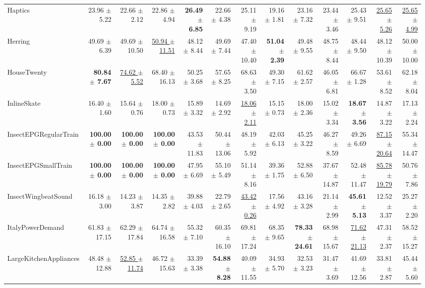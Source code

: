 \begin{landscape}
\begin{longtable}{lrrrrrrrrrrrr}
Haptics & 23.96 $\pm$ 5.22 & 22.66 $\pm$ 2.12 & 22.86 $\pm$ 4.94 & \textbf{26.49 $\pm$ 6.85} & 22.66 $\pm$ 4.38 & 25.11 $\pm$ 9.19 & 19.16 $\pm$ 1.81 & 23.16 $\pm$ 7.32 & 23.44 $\pm$ 3.46 & 25.43 $\pm$ 9.51 & \underline{25.65 $\pm$ 5.26} & \underline{25.65 $\pm$ 4.99} \\
Herring & 49.69 $\pm$ 6.39 & 49.69 $\pm$ 10.50 & \underline{50.94 $\pm$ 11.51} & 48.12 $\pm$ 8.44 & 49.69 $\pm$ 7.44 & 47.40 $\pm$ 10.40 & \textbf{51.04 $\pm$ 2.39} & 49.48 $\pm$ 9.55 & 48.75 $\pm$ 8.44 & 48.44 $\pm$ 9.50 & 48.12 $\pm$ 10.39 & 50.00 $\pm$ 10.00 \\
HouseTwenty & \textbf{80.84 $\pm$ 7.67} & \underline{74.62 $\pm$ 5.52} & 68.40 $\pm$ 16.13 & 50.25 $\pm$ 3.68 & 57.65 $\pm$ 8.25 & 68.63 $\pm$ 3.50 & 49.30 $\pm$ 7.15 & 61.62 $\pm$ 2.57 & 46.05 $\pm$ 6.81 & 66.67 $\pm$ 1.28 & 53.61 $\pm$ 8.52 & 62.18 $\pm$ 8.04 \\
InlineSkate & 16.40 $\pm$ 1.60 & 15.64 $\pm$ 0.76 & 18.00 $\pm$ 0.73 & 15.89 $\pm$ 3.32 & 14.69 $\pm$ 2.92 & \underline{18.06 $\pm$ 2.11} & 15.15 $\pm$ 0.73 & 18.00 $\pm$ 2.36 & 15.02 $\pm$ 3.34 & \textbf{18.67 $\pm$ 3.56} & 14.87 $\pm$ 3.22 & 17.13 $\pm$ 2.24 \\
InsectEPGRegularTrain & \textbf{100.00 $\pm$ 0.00} & \textbf{100.00 $\pm$ 0.00} & \textbf{100.00 $\pm$ 0.00} & 43.53 $\pm$ 11.83 & 50.44 $\pm$ 13.06 & 48.19 $\pm$ 5.92 & 42.03 $\pm$ 6.13 & 45.25 $\pm$ 3.22 & 46.27 $\pm$ 8.59 & 49.26 $\pm$ 6.69 & \underline{87.15 $\pm$ 20.64} & 55.34 $\pm$ 14.47 \\
InsectEPGSmallTrain & \textbf{100.00 $\pm$ 0.00} & \textbf{100.00 $\pm$ 0.00} & \textbf{100.00 $\pm$ 0.00} & 47.95 $\pm$ 6.69 & 55.10 $\pm$ 5.49 & 51.14 $\pm$ 8.16 & 39.36 $\pm$ 1.75 & 52.88 $\pm$ 6.50 & 37.67 $\pm$ 14.87 & 52.48 $\pm$ 11.47 & \underline{85.78 $\pm$ 19.79} & 50.76 $\pm$ 7.86 \\
InsectWingbeatSound & 16.18 $\pm$ 3.00 & 14.23 $\pm$ 3.87 & 14.35 $\pm$ 2.82 & 39.88 $\pm$ 4.03 & 22.79 $\pm$ 2.65 & \underline{43.42 $\pm$ 0.26} & 17.56 $\pm$ 4.92 & 43.16 $\pm$ 3.28 & 21.14 $\pm$ 2.99 & \textbf{45.61 $\pm$ 5.13} & 12.52 $\pm$ 3.37 & 25.27 $\pm$ 2.20 \\
ItalyPowerDemand & 61.83 $\pm$ 17.15 & 62.29 $\pm$ 17.84 & 64.74 $\pm$ 16.58 & 55.32 $\pm$ 7.10 & 60.35 $\pm$ 16.10 & 69.81 $\pm$ 17.24 & 68.35 $\pm$ 9.65 & \textbf{78.33 $\pm$ 24.61} & 68.98 $\pm$ 15.67 & \underline{71.62 $\pm$ 21.13} & 47.31 $\pm$ 2.37 & 58.52 $\pm$ 15.27 \\
LargeKitchenAppliances & 48.48 $\pm$ 12.88 & \underline{52.85 $\pm$ 11.74} & 46.72 $\pm$ 15.63 & 33.39 $\pm$ 3.38 & \textbf{54.88 $\pm$ 8.28} & 40.09 $\pm$ 11.55 & 34.93 $\pm$ 5.70 & 32.53 $\pm$ 3.23 & 31.47 $\pm$ 3.69 & 41.69 $\pm$ 12.56 & 33.81 $\pm$ 2.87 & 45.44 $\pm$ 5.60 \\

\end{longtable}
\end{landscape}
